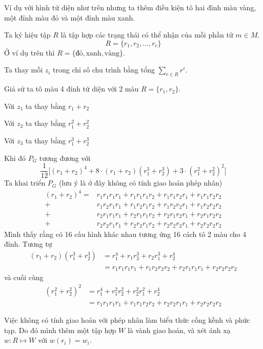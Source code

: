 Ví dụ với hình tứ diện như trên nhưng ta thêm điều kiện tô hai đỉnh màu vàng, một đỉnh màu đỏ và một đỉnh màu xanh.

Ta ký hiệu tập $R$ là tập hợp các trạng thái có thể nhận của mỗi phần tử $m \in M$.
\[R = \{r_1, r_2, \ldots, r_c \}\]
Ở ví dụ trên thì $R = \{\text{đỏ}, \text{xanh}, \text{vàng}\}$.

Ta thay mỗi $z_i$ trong chỉ số chu trình bằng tổng $\displaystyle{\sum_{r \in R} r^i}$.

\begin{example}
    Giả sử ta tô màu 4 đỉnh tứ diện với 2 màu $R = \{r_1, r_2\}$.

    Với $z_1$ ta thay bằng $r_1 + r_2$

    Với $z_2$ ta thay bằng $r_1^2 + r_2^2$

    Với $z_3$ ta thay bằng $r_1^3 + r_2^3$

    Khi đó $P_G$ tương đương với
    \[\frac{1}{12}\big[(r_1 + r_2)^4 + 8 \cdot (r_1 + r_2)(r_1^3 + r_2^3) + 3 \cdot (r_1^2 + r_2^2)^2\big]\]
    Ta khai triển $P_G$ (lưu ý là ở đây không có tính giao hoán phép nhân)
    \begin{align*}
        (r_1 + r_2)^4 = & r_1 r_1 r_1 r_1 + r_1 r_1 r_1 r_2 + r_1 r_1 r_2 r_1 + r_1 r_1 r_2 r_2 \\
        + & r_1 r_2 r_1 r_1 + r_1 r_2 r_1 r_2 + r_1 r_2 r_2 r_1 + r_1 r_2 r_2 r_2 \\
        + & r_2 r_1 r_1 r_1 + r_2 r_1 r_1 r_2 + r_2 r_1 r_2 r_1 + r_2 r_1 r_2 r_2 \\
        + & r_2 r_2 r_1 r_1 + r_2 r_2 r_1 r_2 + r_2 r_2 r_2 r_1 + r_2 r_2 r_2 r_2
    \end{align*}
    Mình thấy rằng có 16 cấu hình khác nhau tương ứng 16 cách tô 2 màu cho 4 đỉnh. Tương tự
    \begin{align*}
        (r_1 + r_2) (r_1^3 + r_2^3) & = r_1^4 + r_1 r_2^3 + r_2 r_1^3 + r_2^4 \\
        & = r_1 r_1 r_1 r_1 + r_1 r_2 r_2 r_2 + r_2 r_1 r_1 r_1 + r_2 r_2 r_2 r_2
    \end{align*}
    và cuối cùng
    \begin{align*}
        (r_1^2 + r_2^2)^2 & = r_1^4 + r_1^2 r_2^2 + r_2^2 r_1^2 + r_2^4 \\
        & = r_1 r_1 r_1 r_1 + r_1 r_1 r_2 r_2 + r_2 r_2 r_1 r_1 + r_2 r_2 r_2 r_2
    \end{align*}

    Việc không có tính giao hoán với phép nhân làm biểu thức cồng kềnh và phức tạp.
    Do đó mình thêm một tập hợp $W$ là vành giao hoán, và xét ánh xạ $w: R \mapsto W$ với $w(r_i) = w_i$.


\end{example}
